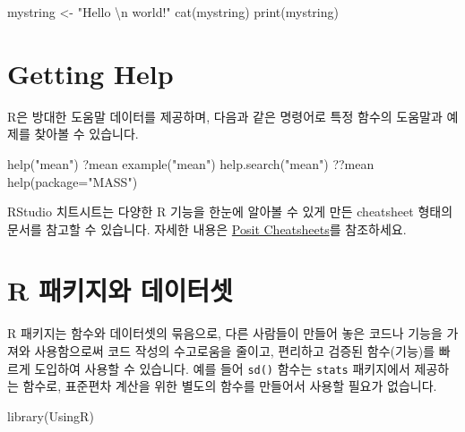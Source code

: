 \documentclass[
  a4paper,
]{book}
\newenvironment{Shaded}{\begin{snugshade}}{\end{snugshade}}
\newcommand{\AttributeTok}[1]{\textcolor[rgb]{0.40,0.45,0.13}{#1}}
\newcommand{\FunctionTok}[1]{\textcolor[rgb]{0.28,0.35,0.67}{#1}}
\newcommand{\NormalTok}[1]{\textcolor[rgb]{0.00,0.23,0.31}{#1}}
\newcommand{\OtherTok}[1]{\textcolor[rgb]{0.00,0.23,0.31}{#1}}
\newcommand{\SpecialCharTok}[1]{\textcolor[rgb]{0.37,0.37,0.37}{#1}}
\newcommand{\StringTok}[1]{\textcolor[rgb]{0.13,0.47,0.30}{#1}}
\begin{document}
\begin{Shaded}
\begin{Highlighting}[]
\NormalTok{mystring }\OtherTok{\textless{}{-}} \StringTok{"Hello }\SpecialCharTok{\textbackslash{}n}\StringTok{ world!"}
\FunctionTok{cat}\NormalTok{(mystring)}
\FunctionTok{print}\NormalTok{(mystring)}
\end{Highlighting}
\end{Shaded}

\hypertarget{getting-help}{%
\section{Getting Help}\label{getting-help}}

R은 방대한 도움말 데이터를 제공하며, 다음과 같은 명령어로 특정 함수의
도움말과 예제를 찾아볼 수 있습니다.

\begin{Shaded}
\begin{Highlighting}[]
\FunctionTok{help}\NormalTok{(}\StringTok{"mean"}\NormalTok{)}
\NormalTok{?mean}
\FunctionTok{example}\NormalTok{(}\StringTok{"mean"}\NormalTok{)}
\FunctionTok{help.search}\NormalTok{(}\StringTok{"mean"}\NormalTok{)}
\NormalTok{??mean}
\FunctionTok{help}\NormalTok{(}\AttributeTok{package=}\StringTok{"MASS"}\NormalTok{)}
\end{Highlighting}
\end{Shaded}

RStudio 치트시트는 다양한 R 기능을 한눈에 알아볼 수 있게 만든 cheatsheet
형태의 문서를 참고할 수 있습니다. 자세한 내용은
\href{https://posit.co/resources/cheatsheets/}{Posit Cheatsheets}를
참조하세요.

\hypertarget{r-uxd328uxd0a4uxc9c0uxc640-uxb370uxc774uxd130uxc14b}{%
\section{R 패키지와
데이터셋}\label{r-uxd328uxd0a4uxc9c0uxc640-uxb370uxc774uxd130uxc14b}}

R 패키지는 함수와 데이터셋의 묶음으로, 다른 사람들이 만들어 놓은 코드나
기능을 가져와 사용함으로써 코드 작성의 수고로움을 줄이고, 편리하고
검증된 함수(기능)를 빠르게 도입하여 사용할 수 있습니다. 예를 들어
\texttt{sd()} 함수는 \texttt{stats} 패키지에서 제공하는 함수로, 표준편차
계산을 위한 별도의 함수를 만들어서 사용할 필요가 없습니다.

\begin{Shaded}
\begin{Highlighting}[]
\FunctionTok{library}\NormalTok{(UsingR)}
\end{Highlighting}
\end{Shaded}
\end{document}
